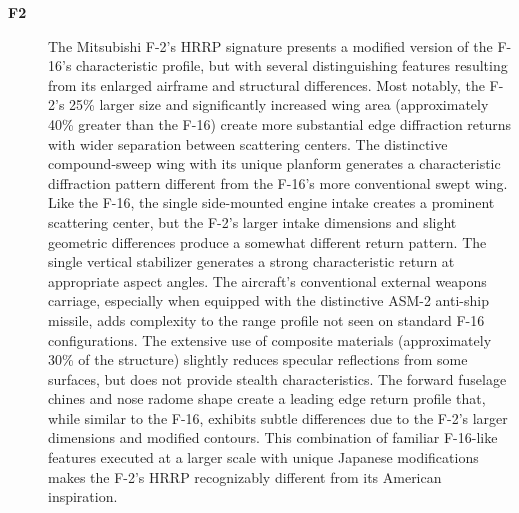 {\begin{description}
    \item[\textbf{F2}]
    The Mitsubishi F-2's HRRP signature presents a modified version of the F-16's characteristic profile, but with several distinguishing features resulting from its enlarged airframe and structural differences. Most notably, the F-2's 25\% larger size and significantly increased wing area (approximately 40\% greater than the F-16) create more substantial edge diffraction returns with wider separation between scattering centers. The distinctive compound-sweep wing with its unique planform generates a characteristic diffraction pattern different from the F-16's more conventional swept wing. Like the F-16, the single side-mounted engine intake creates a prominent scattering center, but the F-2's larger intake dimensions and slight geometric differences produce a somewhat different return pattern. The single vertical stabilizer generates a strong characteristic return at appropriate aspect angles. The aircraft's conventional external weapons carriage, especially when equipped with the distinctive ASM-2 anti-ship missile, adds complexity to the range profile not seen on standard F-16 configurations. The extensive use of composite materials (approximately 30\% of the structure) slightly reduces specular reflections from some surfaces, but does not provide stealth characteristics. The forward fuselage chines and nose radome shape create a leading edge return profile that, while similar to the F-16, exhibits subtle differences due to the F-2's larger dimensions and modified contours. This combination of familiar F-16-like features executed at a larger scale with unique Japanese modifications makes the F-2's HRRP recognizably different from its American inspiration.


\end{description}}
